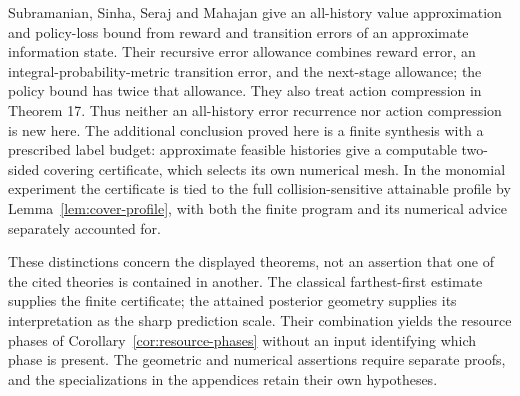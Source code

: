 Subramanian, Sinha, Seraj and Mahajan
\cite[Definition 7 and Theorem 9]{Subramanian} give an all-history
value approximation and policy-loss bound from reward and transition
errors of an approximate information state. Their recursive error
allowance combines reward error, an integral-probability-metric transition
error, and the next-stage allowance; the policy bound has twice that
allowance. They also treat action compression in Theorem 17. Thus
neither an all-history error recurrence nor action compression is new
here. The additional conclusion proved here is a finite synthesis with
a prescribed label budget: approximate feasible histories give a
computable two-sided covering certificate, which selects its own
numerical mesh. In the monomial experiment the certificate is tied to
the full collision-sensitive attainable profile by
Lemma~\ref{lem:cover-profile}, with both the finite program and its
numerical advice separately accounted for.

These distinctions concern the displayed theorems, not an assertion that
one of the cited theories is contained in another. The classical
farthest-first estimate supplies the finite certificate; the attained
posterior geometry supplies its interpretation as the sharp prediction
scale. Their combination yields the resource phases of
Corollary~\ref{cor:resource-phases} without an input identifying which
phase is present. The geometric and numerical assertions require separate
proofs, and the specializations in the appendices retain their own
hypotheses.

